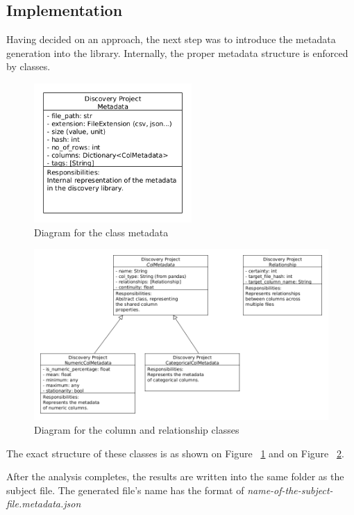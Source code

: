 \subsection{Implementation}

Having decided on an approach, the next step was to introduce the metadata generation into the library.
Internally, the proper metadata structure is enforced by classes.

\begin{figure}[H]
    \centering
    \includegraphics[width=6cm]{figures/metadata/metadata_class}
    \caption{Diagram for the class metadata}
    \label{fig:metadata_fig_1}
\end{figure}



\begin{figure}[H]
    \centering
    \includegraphics[width=12cm]{figures/metadata/col_rel_class}
    \caption{Diagram for the column and relationship classes}
    \label{fig:metadata_fig_2}
\end{figure}

The exact structure of these classes is as shown on Figure ~\ref{fig:metadata_fig_1} and on Figure ~\ref{fig:metadata_fig_2}.

After the analysis completes, the results are written into the same folder as the subject file.
The generated file's name has the format of \textit{name-of-the-subject-file.metadata.json}

